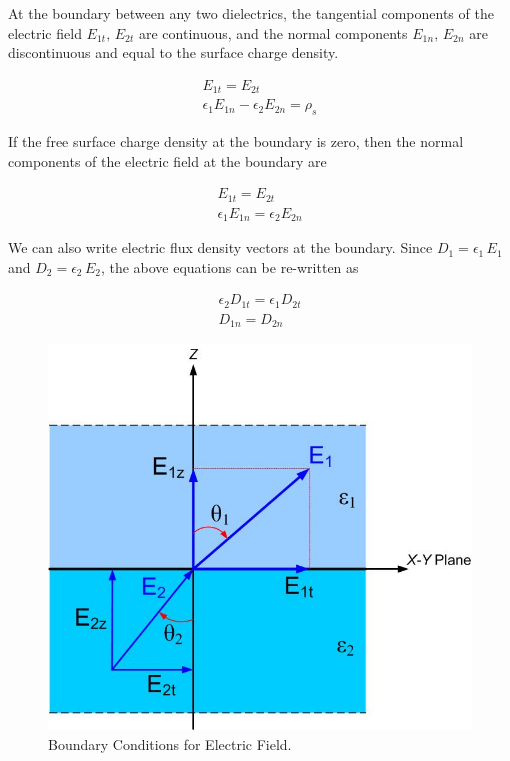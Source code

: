\documentclass{ximera}
\begin{document}
At the boundary between any two dielectrics, the tangential components of the electric field $E_{1t}, \, E_{2t}$ are continuous, and the normal components $E_{1n}, \, E_{2n}$ are discontinuous and equal to the surface charge density.  


\begin{eqnarray}
E_{1t}=E_{2t} \\
\epsilon_1 E_{1n}-\epsilon_2 E_{2n}=\rho_s 
\end{eqnarray} 

If the free surface charge density at the boundary is zero, then the normal components of the electric field at the boundary are


\begin{eqnarray}
E_{1t}=E_{2t} \\
\epsilon_1 E_{1n}=\epsilon_2 E_{2n}
\end{eqnarray} 


We can also write electric flux density vectors at the boundary. Since     
 $D_1=\epsilon_1 \,E_1$ and   $D_{2}=\epsilon_2 \,E_{2}$, the above equations can be re-written as


\begin{eqnarray}
\epsilon_2 D_{1t}=\epsilon_1 D_{2t}  \\
D_{1n}=D_{2n}
\end{eqnarray} 

\begin{figure}[htbp]
\begin{center}
\includegraphics[scale=0.4]{../jpg/boundaryconditions.jpg}
\end{center}
\caption{Boundary Conditions for Electric Field.}
\label{fig:BoundaryCondition}
\end{figure}
\end{document}
